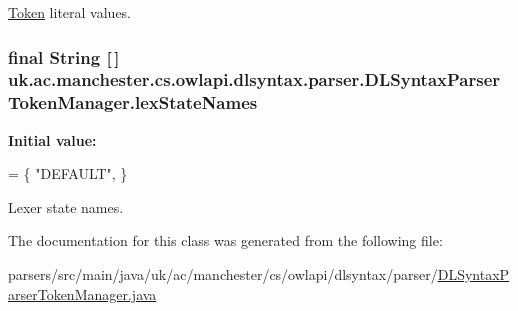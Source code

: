\hyperlink{classuk_1_1ac_1_1manchester_1_1cs_1_1owlapi_1_1dlsyntax_1_1parser_1_1_token}{Token} literal values. \hypertarget{classuk_1_1ac_1_1manchester_1_1cs_1_1owlapi_1_1dlsyntax_1_1parser_1_1_d_l_syntax_parser_token_manager_a811c2b61ac8ed6ee71c226eec3f277a0}{
\subsubsection[{lex\-State\-Names}]{\setlength{\rightskip}{0pt plus 5cm}final String \mbox{[}$\,$\mbox{]} uk.\-ac.\-manchester.\-cs.\-owlapi.\-dlsyntax.\-parser.\-D\-L\-Syntax\-Parser\-Token\-Manager.\-lex\-State\-Names\hspace{0.3cm}{\ttfamily [static]}}}\label{classuk_1_1ac_1_1manchester_1_1cs_1_1owlapi_1_1dlsyntax_1_1parser_1_1_d_l_syntax_parser_token_manager_a811c2b61ac8ed6ee71c226eec3f277a0}
{\bfseries Initial value\-:}
\begin{DoxyCode}
= \{
        \textcolor{stringliteral}{"DEFAULT"},
    \}
\end{DoxyCode}
Lexer state names. 

The documentation for this class was generated from the following file\-:\begin{DoxyCompactItemize}
\item 
parsers/src/main/java/uk/ac/manchester/cs/owlapi/dlsyntax/parser/\hyperlink{_d_l_syntax_parser_token_manager_8java}{D\-L\-Syntax\-Parser\-Token\-Manager.\-java}\end{DoxyCompactItemize}
